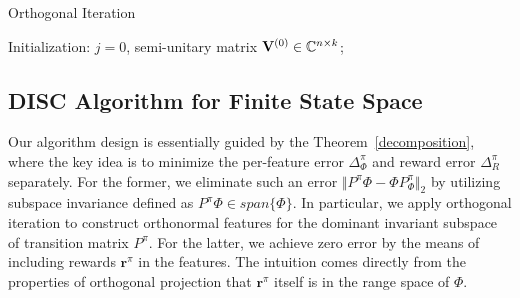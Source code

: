 \documentclass[onecolumn, conference]{IEEEtran}
\begin{document}
\begin{algorithm}[H]
        \caption{Orthogonal Iteration}\label{OI}


        Initialization: $j = 0$, semi-unitary matrix ${\bf V}^{(0)}\in \mathbb{C}^{n\times k}$; \\
\end{algorithm}
\subsection{DISC Algorithm for Finite State Space}\label{sec:small scale}

Our algorithm design is essentially guided by the Theorem~\ref{decomposition}, where the key idea is to minimize the per-feature error $\Delta_\Phi^\pi$ and reward error $\Delta_R^{\pi}$ separately. For the former, we eliminate such an error $\Vert P^\pi \Phi - \Phi P^\pi_\Phi\Vert_2$ by utilizing subspace invariance defined as $P^\pi\Phi \in span\{\Phi\}$. In particular, we apply orthogonal iteration to construct orthonormal features for the dominant invariant subspace of transition matrix $P^\pi$. For the latter, we achieve zero error by the means of including rewards $\boldsymbol{r}^\pi$ in the features. The intuition comes directly from the properties of orthogonal projection that $\boldsymbol{r}^\pi$ itself is in the range space of $\Phi$.
\end{document}
